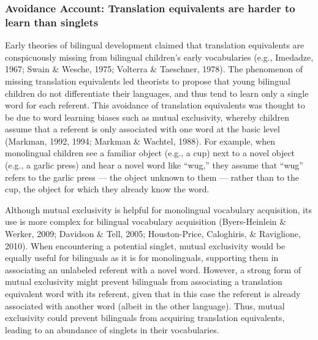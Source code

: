 \documentclass[
  english,
  ,man,floatsintext]{apa6}
\begin{document}
\hypertarget{avoidance-account-translation-equivalents-are-harder-to-learn-than-singlets}{%
\subsubsection{Avoidance Account: Translation equivalents are harder to learn than singlets}\label{avoidance-account-translation-equivalents-are-harder-to-learn-than-singlets}}

Early theories of bilingual development claimed that translation equivalents are conspicuously missing from bilingual children's early vocabularies (e.g., Imedadze, 1967; Swain \& Wesche, 1975; Volterra \& Taeschner, 1978). The phenomenon of missing translation equivalents led theorists to propose that young bilingual children do not differentiate their languages, and thus tend to learn only a single word for each referent. This avoidance of translation equivalents was thought to be due to word learning biases such as mutual exclusivity, whereby children assume that a referent is only associated with one word at the basic level (Markman, 1992, 1994; Markman \& Wachtel, 1988). For example, when monolingual children see a familiar object (e.g., a cup) next to a novel object (e.g., a garlic press) and hear a novel word like ``wug,'' they assume that ``wug'' refers to the garlic press --- the object unknown to them --- rather than to the cup, the object for which they already know the word.

Although mutual exclusivity is helpful for monolingual vocabulary acquisition, its use is more complex for bilingual vocabulary acquisition (Byers-Heinlein \& Werker, 2009; Davidson \& Tell, 2005; Houston-Price, Caloghiris, \& Raviglione, 2010). When encountering a potential singlet, mutual exclusivity would be equally useful for bilinguals as it is for monolinguals, supporting them in associating an unlabeled referent with a novel word. However, a strong form of mutual exclusivity might prevent bilinguals from associating a translation equivalent word with its referent, given that in this case the referent is already associated with another word (albeit in the other language). Thus, mutual exclusivity could prevent bilinguals from acquiring translation equivalents, leading to an abundance of singlets in their vocabularies.
\end{document}
